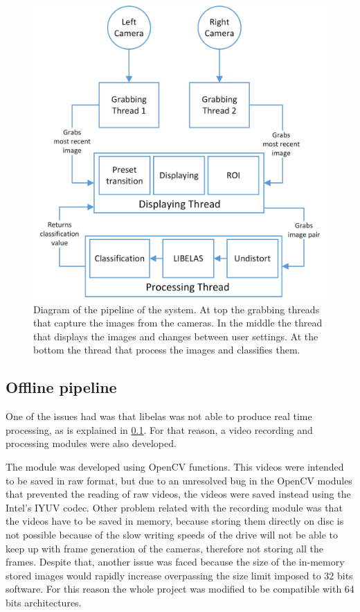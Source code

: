 \documentclass[10pt,a4paper,twocolumn,twoside]{article}
\begin{document}
	\begin{figure}
		\centering
		\includegraphics[width=1\linewidth]{img/pipeline.png}
		\caption{Diagram of the pipeline of the system. At top the grabbing threads that capture the images from the cameras. In the middle the thread that displays the images and changes between user settings. At the bottom the thread that process the images and classifies them.   }
		\label{fig:pipeline}
	\end{figure}
	
	
	\subsection{Offline pipeline}
	One of the issues had was that libelas was not able to produce real time processing, as is explained in \ref{}. For that reason, a video recording and processing modules were also developed.  
	
	The module was developed using OpenCV functions. This videos were intended to be saved in raw format, but due to an unresolved bug in the OpenCV modules that prevented the reading of raw videos, the videos were saved instead using the Intel's IYUV codec. %
	Other problem related with the recording module was that the videos have to be saved in memory, because storing them directly on disc is not possible because of the slow writing speeds of the drive will not be able to keep up with frame generation of the cameras, therefore not storing all the frames. Despite that, another issue was faced because the size of the in-memory stored images would rapidly increase overpassing the size limit imposed to 32 bits software. For this reason the whole project was modified to be compatible with 64 bits architectures.
	
\end{document}
